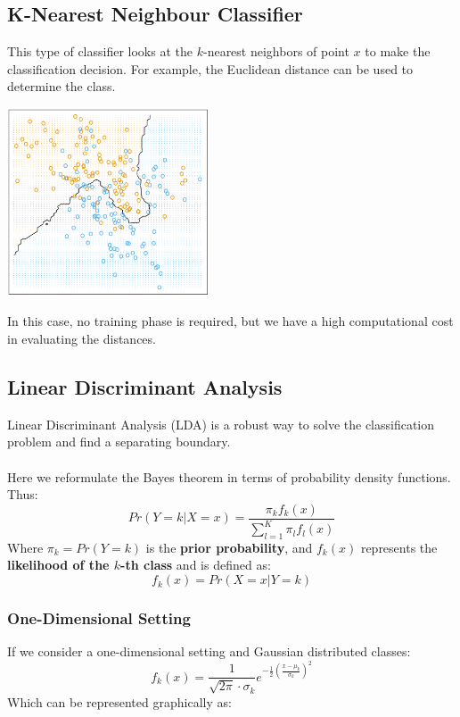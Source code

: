 \documentclass{article}
\begin{document}
\subsection{K-Nearest Neighbour Classifier}
This type of classifier looks at the $k$-nearest neighbors of point $x$ to make the classification decision. For example, the Euclidean distance can be used to determine the class.

\begin{center}
	\includegraphics[width=6cm]{nearest_neighbors.png}
\end{center}
In this case, no training phase is required, but we have a high computational cost in evaluating the distances.

\subsection{Linear Discriminant Analysis}
Linear Discriminant Analysis (LDA) is a robust way to solve the classification problem and find a separating boundary. \\ \\
Here we reformulate the Bayes theorem in terms of probability density functions. Thus:
\[ Pr(Y = k|X = x) = \frac{\pi_kf_k(x)}{\sum^K_{l=1} \pi_lf_l(x)} \]
Where $\pi_k = Pr(Y=k)$ is the \textbf{prior probability}, and $f_k(x)$ represents the \textbf{likelihood of the $k$-th class} and is defined as:
\[ f_k(x) = Pr(X=x|Y=k) \]

\subsubsection{One-Dimensional Setting}
If we consider a one-dimensional setting and Gaussian distributed classes:
\[ f_k(x) = \frac{1}{\sqrt{2\pi} \cdot \sigma_k}e^{-\frac{1}{2}\left( \frac{x-\mu_k}{\sigma_k} \right)^2} \]
Which can be represented graphically as:
\end{document}
